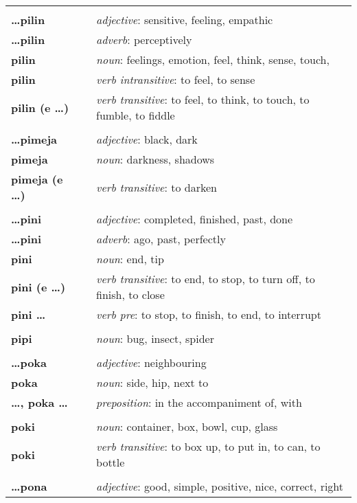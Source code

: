 \begin{supertabular}{p{2,5cm}|ll}
 && \\ %
\textbf{\dots pilin} && \textit{adjective}: sensitive, feeling, empathic \\ 
\textbf{\dots pilin} && \textit{adverb}: perceptively \\ 
\textbf{pilin} && \textit{noun}: feelings, emotion, feel, think, sense, touch, \\ 
\textbf{pilin} && \textit{verb intransitive}: to feel, to sense \\ 
\textbf{pilin (e \dots)} && \textit{verb transitive}: to feel, to think, to touch, to fumble, to fiddle \\ 
 && \\ %
\textbf{\dots pimeja} && \textit{adjective}: black, dark \\ 
\textbf{pimeja} && \textit{noun}: darkness, shadows \\ 
\textbf{pimeja (e \dots)} && \textit{verb transitive}: to darken \\ 
 && \\ %
\textbf{\dots pini} && \textit{adjective}: completed, finished, past, done \\ 
\textbf{\dots pini} && \textit{adverb}: ago, past, perfectly \\ 
\textbf{pini} && \textit{noun}: end, tip \\ 
\textbf{pini (e \dots)} && \textit{verb transitive}: to end, to stop, to turn off, to finish, to close \\ 
\textbf{pini \dots } && \textit{verb pre}: to stop, to finish, to end, to interrupt \\ 
 && \\ %
\textbf{pipi} && \textit{noun}: bug, insect, spider \\ 
 && \\ %
\textbf{\dots poka} && \textit{adjective}: neighbouring \\ 
\textbf{poka} && \textit{noun}: side, hip, next to \\ 
\textbf{\dots , poka \dots} && \textit{preposition}: in the accompaniment of, with \\ 
 && \\ %
\textbf{poki} && \textit{noun}: container, box, bowl, cup, glass \\ 
\textbf{poki } && \textit{verb transitive}: to box up, to put in, to can, to bottle \\ 
 && \\ %
\textbf{\dots pona} && \textit{adjective}: good, simple, positive, nice, correct, right \\ 

\end{supertabular}
